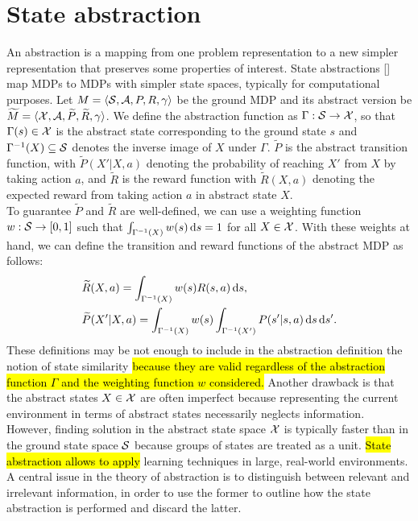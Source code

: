 \section{State abstraction} \label{sec:stdisc}

An abstraction is a mapping from one problem representation to a new simpler representation that preserves some properties of interest. State abstractions [\cite{lihong2006towards}] map MDPs to MDPs with simpler state spaces, typically for computational purposes. Let $ M = \langle \mathcal{S}, \mathcal{A}, P, R, \gamma \rangle$ be the ground MDP and its abstract version be $\widetilde{M} = \langle \mathcal{X}, \mathcal{A}, \widetilde{P}, \widetilde{R}, \gamma \rangle$. We define the abstraction function as $\Gamma: \mathcal{S} \to \mathcal{X}$, so that $\Gamma(s)\in\mathcal{X}$ is the abstract state corresponding to the ground state $s$ and $\Gamma^{-1}(X)\subseteq\mathcal{S}$ denotes the inverse image of $X$ under $\Gamma$. $\widetilde{P}$ is the abstract transition function, with $\widetilde{P}(X'|X,a)$ denoting the probability of reaching $X'$ from $X$ by taking action $a$, and $\widetilde{R}$ is the reward function with $\widetilde{R}(X,a)$ denoting the expected reward from taking action $a$ in abstract state $X$.\\
\newline
To guarantee $\widetilde{P}$ and $\widetilde{R}$ are well-defined, we can use a weighting function  $w: \mathcal{S} \to [0, 1]$ such that $\int_{\Gamma^{-1}(X)} w(s)\,\mathrm{d} s = 1$ for all $X \in \mathcal{X}$. With these weights at hand, we can define the transition and reward functions of the abstract MDP as follows:
%
\begin{align}
&\widetilde{R}(X,a) = \int_{\Gamma^{-1}(X)}w(s)R(s,a)\,\mathrm{d} s,\nonumber \\
&\widetilde{P}(X'|X,a) = \int_{\Gamma^{-1}(X)}w(s)\int_{\Gamma^{-1}(X')} P(s'|s,a)\,\mathrm{d} s\,\mathrm{d} s'.\nonumber
\end{align}
%
These definitions may be not enough to include in the abstraction definition the notion of state similarity \hl{because they are valid regardless of the abstraction function $\Gamma$ and the weighting function $w$ considered.} Another drawback is that the abstract states $X \in \mathcal{X}$ are often imperfect because representing the current environment in terms of abstract states necessarily neglects information. However, finding solution in the abstract state space $\mathcal{X}$ is typically faster than in the ground state space $\mathcal{S}$ because groups of states are treated as a unit. \hl{State abstraction allows to apply} learning techniques in large, real-world environments. A central issue in the theory of abstraction is to distinguish between relevant and irrelevant information, in order to use the former to outline how the state abstraction is performed and discard the latter.\\
